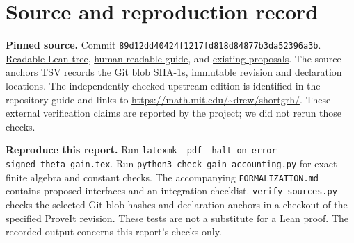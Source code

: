 \documentclass[11pt,letterpaper]{article}
\theoremstyle{remark}\newtheorem{remark}[theorem]{Remark}
\begin{document}
\section*{Source and reproduction record}
\small
\textbf{Pinned source.} Commit \nolinkurl{89d12dd40424f1217fd818d84877b3da52396a3b}. \href{https://github.com/VladimirReshetnikov/ProveIt/tree/89d12dd40424f1217fd818d84877b3da52396a3b/Analysis/GeneralizedRiemannHypothesis/Lean/grh}{Readable Lean tree}, \href{https://github.com/VladimirReshetnikov/ProveIt/tree/89d12dd40424f1217fd818d84877b3da52396a3b/Analysis/GeneralizedRiemannHypothesis/docs/guide}{human-readable guide}, and \href{https://github.com/VladimirReshetnikov/ProveIt/tree/89d12dd40424f1217fd818d84877b3da52396a3b/Analysis/GeneralizedRiemannHypothesis/docs/proposals}{existing proposals}. The source anchors TSV records the Git blob SHA-1s, immutable revision and declaration locations. The independently checked upstream edition is identified in the repository guide and links to \url{https://math.mit.edu/~drew/shortgrh/}. These external verification claims are reported by the project; we did not rerun those checks.

\textbf{Reproduce this report.} Run \texttt{latexmk -pdf -halt-on-error signed\_theta\_gain.tex}. Run \texttt{python3 check\_gain\_accounting.py} for exact finite algebra and constant checks. The accompanying \texttt{FORMALIZATION.md} contains proposed interfaces and an integration checklist. \texttt{verify\_sources.py} checks the selected Git blob hashes and declaration anchors in a checkout of the specified ProveIt revision. These tests are not a substitute for a Lean proof. The recorded output concerns this report's checks only.
\end{document}
